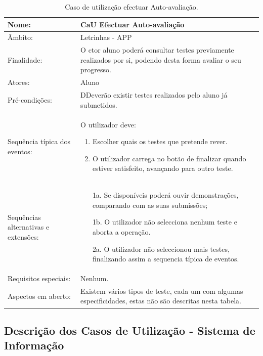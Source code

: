 \documentclass[a4paper]{article}
\begin{document}
		
							
		
		
						\newpage
						\begin {table}[h]
						\begin{tabular}{|p{2cm} p{10cm}|}
							\hline Nome: & CaU Efectuar Auto-avaliação \\ 
							\hline Âmbito: & Letrinhas - APP \\ 
							\hline Finalidade: & O ctor aluno poderá consultar testes previamente realizados por si, podendo desta forma avaliar o seu progresso.  \\ 
							\hline Atores: & Aluno \\ 
						    \hline Pré-condições: & DDeverão existir testes realizados pelo aluno já submetidos. \\ 
						    \hline Sequência típica dos eventos: &  					
							O utilizador deve:
						    \begin{enumerate}
						    	\item	Escolher quais os testes que pretende rever.
								\item	O utilizador carrega no botão de finalizar quando estiver satisfeito, avançando para outro teste.

						    \end{enumerate} \\ 
		  				    \hline Sequências alternativas e extensões: & 
		  				    \begin{enumerate}			    	
		  				    	\item[1a.] Se disponíveis poderá ouvir demonstrações, comparando com as suas submissões;
								\item[1b.] O utilizador não selecciona nenhum teste e aborta a operação.
								\item[2a.] O utilizador não seleccionou mais testes, finalizando assim a sequencia típica de eventos.

		
		  				    \end{enumerate}
		  				     \\ 
		  				    \hline Requisitos especiais: & Nenhum.\\ 
		  				    \hline Aspectos em aberto: & Existem vários tipos de teste, cada um com algumas especificidades, estas não são descritas nesta tabela.  \\
							\hline 
						\end{tabular}
						\caption{Caso de utilização efectuar Auto-avaliação.}
					\end{table} 
	\newpage
	\subsection{Descrição dos Casos de Utilização - Sistema de Informação}
	
\end{document}
